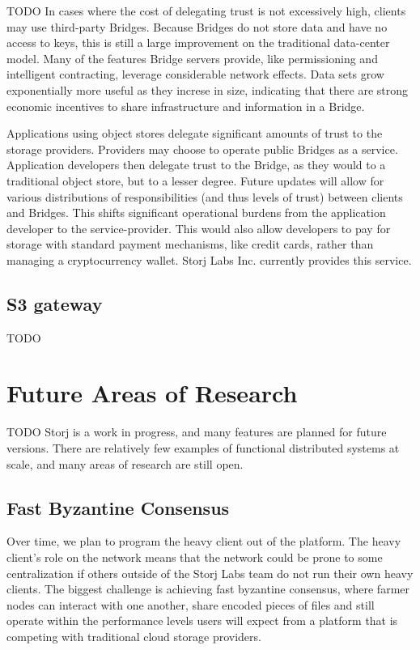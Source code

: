 \documentclass[a4paper,10pt]{article} \usepackage[utf8]{inputenc}
\newcommand{\todo}[1]{{\color{red} TODO #1}}
\begin{document}
\todo{ In cases where the cost of delegating trust is not excessively high,
clients may use third-party Bridges. Because Bridges do not store data and have
no access to keys, this is still a large improvement on the traditional
data-center model. Many of the features Bridge servers provide, like
permissioning and intelligent contracting, leverage considerable network
effects. Data sets grow exponentially more useful as they increse in size,
indicating that there are strong economic incentives to share infrastructure and
information in a Bridge.

Applications using object stores delegate significant amounts of trust to the
storage providers. Providers may choose to operate public Bridges as a service.
Application developers then delegate trust to the Bridge, as they would to a
traditional object store, but to a lesser degree. Future updates will allow for
various distributions of responsibilities (and thus levels of trust) between
clients and Bridges. This shifts significant operational burdens from the
application developer to the service-provider. This would also allow developers
to pay for storage with standard payment mechanisms, like credit cards, rather
than managing a cryptocurrency wallet. Storj Labs Inc. currently provides this
service. }

\subsection{S3 gateway}

\todo{}

\section{Future Areas of Research}\label{sec:future_work}

\todo{ Storj is a work in progress, and many features are planned for future
versions. There are relatively few examples of functional distributed systems at
scale, and many areas of research are still open. }

\subsection{Fast Byzantine Consensus}

Over time, we plan to program the heavy client out of the platform. The heavy 
client’s role on the network means that the network could be prone to some 
centralization if others outside of the Storj Labs team do not run their own 
heavy clients. The biggest challenge is achieving fast byzantine consensus, 
where farmer nodes can interact with one another, share encoded pieces of files 
and still operate within the performance levels users will expect from a 
platform that is competing with traditional cloud storage providers. 
\end{document}
